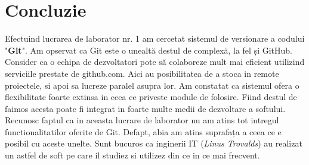 \section*{Concluzie}
Efectuind lucrarea de laborator nr. 1 am cercetat sistemul de versionare a codului "\textbf{Git}". Am opservat ca Git este o unealtă destul de complexă, la fel și GitHub. Consider ca o echipa de dezvoltatori pote să colaboreze mult mai eficient utilizind serviciile prestate de github.com. Aici au posibilitatea de a stoca in remote proiectele, si apoi sa lucreze paralel asupra lor. Am constatat ca sistemul ofera o flexibilitate foarte extinsa in ceea ce priveste module de folosire. Fiind destul de faimos acesta poate fi integrat in foarte multe medii de dezvoltare a softului.\\
Recunosc faptul ca in aceasta lucrare de laborator nu am atins tot intregul functionalitatilor oferite de Git. Defapt, abia am atins suprafața a ceea ce e posibil cu aceste unelte. Sunt bucuros ca inginerii IT (\emph{Linus Trovalds}) au realizat un astfel de soft pe care il studiez si utilizez din ce in ce mai frecvent.
\clearpage